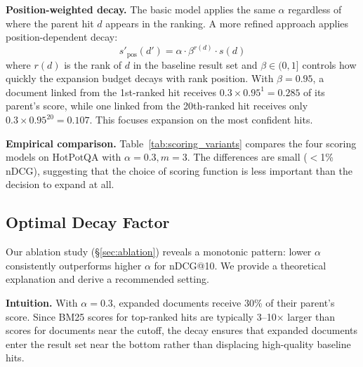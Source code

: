 \documentclass[sigconf,review]{acmart}
\begin{document}
\textbf{Position-weighted decay.}
The basic model applies the same $\alpha$ regardless of where the
parent hit $d$ appears in the ranking.  A more refined approach
applies position-dependent decay:
\[
  s'_{\text{pos}}(d') = \alpha \cdot \beta^{r(d)} \cdot s(d)
\]
where $r(d)$ is the rank of $d$ in the baseline result set and
$\beta \in (0, 1]$ controls how quickly the expansion budget
decays with rank position.  With $\beta = 0.95$, a document linked
from the 1st-ranked hit receives $0.3 \times 0.95^1 = 0.285$ of
its parent's score, while one linked from the 20th-ranked hit
receives only $0.3 \times 0.95^{20} = 0.107$.  This focuses
expansion on the most confident hits.

\textbf{Empirical comparison.}
Table~\ref{tab:scoring_variants} compares the four scoring models
on HotPotQA with $\alpha=0.3, m=3$.  The differences are small
($<$1\% nDCG), suggesting that the choice of scoring function is
less important than the decision to expand at all.

\begin{table}[t]
\caption{Scoring model comparison (BM25, $\alpha=0.3$, $m=3$, HotpotQA).}
\label{tab:scoring_variants}
\centering
{}
\end{table}

\subsection{Optimal Decay Factor}
\label{sec:decay}

Our ablation study (\S\ref{sec:ablation}) reveals a monotonic pattern:
lower $\alpha$ consistently outperforms higher $\alpha$ for nDCG@10.
We provide a theoretical explanation and derive a recommended setting.

\textbf{Intuition.}
With $\alpha = 0.3$, expanded documents receive 30\% of their parent's
score.  Since BM25 scores for top-ranked hits are typically 3--10$\times$
larger than scores for documents near the cutoff, the decay ensures
that expanded documents enter the result set near the bottom rather
than displacing high-quality baseline hits.
\end{document}

